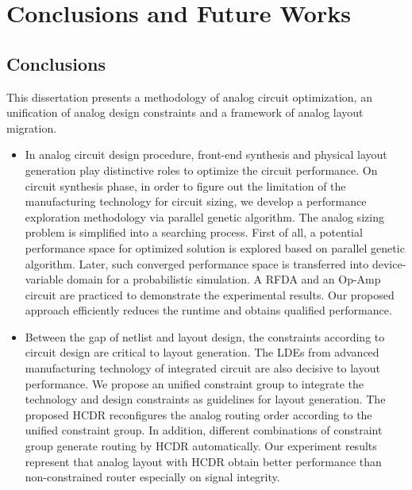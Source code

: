 
\chapter{Conclusions and Future Works}\label{chap:CFW}

  \section{Conclusions}\label{sec:Conclusion}

    This dissertation presents a methodology of analog circuit optimization, an unification of analog design constraints and a framework of analog layout migration. 

    \begin{itemize}
      \item In analog circuit design procedure, front-end synthesis and physical layout generation play distinctive roles to optimize the circuit performance. On circuit synthesis phase, in order to figure out the limitation of the manufacturing technology for circuit sizing, we develop a performance exploration methodology via parallel genetic algorithm. The analog sizing problem is simplified into a searching process. First of all, a potential performance space for optimized solution is explored based on parallel genetic algorithm. Later, such converged performance space is transferred into device-variable domain for a probabilistic simulation. A RFDA and an Op-Amp circuit are practiced to demonstrate the experimental results. Our proposed approach efficiently reduces the runtime and obtains qualified performance. 
      \item Between the gap of netlist and layout design, the constraints according to circuit design are critical to layout generation. The LDEs from advanced manufacturing technology of integrated circuit are also decisive to layout performance. We propose an unified constraint group to integrate the technology and design constraints as guidelines for layout generation. The proposed HCDR reconfigures the analog routing order according to the unified constraint group. In addition, different combinations of constraint group generate routing by HCDR automatically. Our experiment results represent that analog layout with HCDR obtain better performance than non-constrained router especially on signal integrity. 

\end{itemize}
